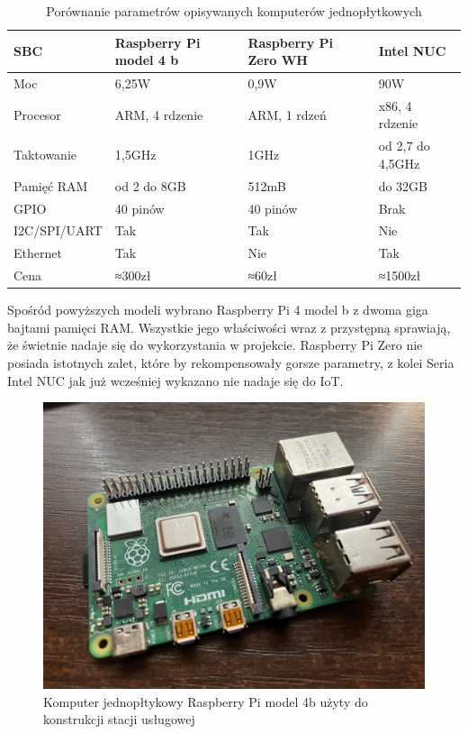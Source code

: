 \documentclass[12pt, twoside, openany]{mwrep}
\begin{document}
\begin{table}[H]
\centering
\begin{tabular}{|l|l|l|l|}
\hline
SBC          & Raspberry Pi model 4 b & Raspberry Pi Zero WH & Intel NUC        \\ \hline
Moc          & 6,25W                  & 0,9W                 & 90W              \\ \hline
Procesor     & ARM, 4 rdzenie         & ARM, 1 rdzeń         & x86, 4 rdzenie   \\ \hline
Taktowanie   & 1,5GHz                 & 1GHz                 & od 2,7 do 4,5GHz \\ \hline
Pamięć RAM   & od 2 do 8GB            & 512mB                & do 32GB          \\ \hline
GPIO         & 40 pinów               & 40 pinów             & Brak             \\ \hline
I2C/SPI/UART & Tak                    & Tak                  & Nie              \\ \hline
Ethernet     & Tak                    & Nie                  & Tak              \\ \hline
Cena         & ≈300zł                 & ≈60zł                & ≈1500zł          \\ \hline
\end{tabular}
\caption{Porównanie parametrów opisywanych komputerów jednopłytkowych}
\end{table}
\par
Spośród powyższych modeli wybrano Raspberry Pi 4 model b z dwoma giga bajtami pamięci RAM. Wszystkie jego właściwości wraz z przystępną sprawiają, że świetnie nadaje się do wykorzystania w projekcie. Raspberry Pi Zero nie posiada istotnych zalet, które by rekompensowały gorsze parametry, z kolei Seria Intel NUC jak już wcześniej wykazano nie nadaje się do IoT.
\begin{figure}[H]
\centering
\includegraphics[width=\textwidth]{rpi}
\caption{Komputer jednopłtykowy Raspberry Pi model 4b użyty do konstrukcji stacji usługowej}
\end{figure}
\end{document}
